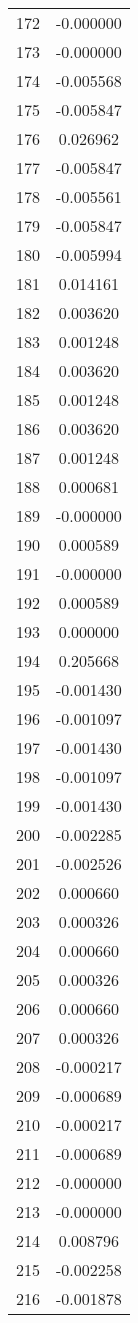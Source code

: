 \documentclass[12pt]{article}
\begin{document}
\begin{longtable}{@{}cc@{}}
172 & -0.000000 \\
173 & -0.000000 \\
174 & -0.005568 \\
175 & -0.005847 \\
176 & 0.026962 \\
177 & -0.005847 \\
178 & -0.005561 \\
179 & -0.005847 \\
180 & -0.005994 \\
181 & 0.014161 \\
182 & 0.003620 \\
183 & 0.001248 \\
184 & 0.003620 \\
185 & 0.001248 \\
186 & 0.003620 \\
187 & 0.001248 \\
188 & 0.000681 \\
189 & -0.000000 \\
190 & 0.000589 \\
191 & -0.000000 \\
192 & 0.000589 \\
193 & 0.000000 \\
194 & 0.205668 \\
195 & -0.001430 \\
196 & -0.001097 \\
197 & -0.001430 \\
198 & -0.001097 \\
199 & -0.001430 \\
200 & -0.002285 \\
201 & -0.002526 \\
202 & 0.000660 \\
203 & 0.000326 \\
204 & 0.000660 \\
205 & 0.000326 \\
206 & 0.000660 \\
207 & 0.000326 \\
208 & -0.000217 \\
209 & -0.000689 \\
210 & -0.000217 \\
211 & -0.000689 \\
212 & -0.000000 \\
213 & -0.000000 \\
214 & 0.008796 \\
215 & -0.002258 \\
216 & -0.001878 \\

\end{longtable}
\end{document}
